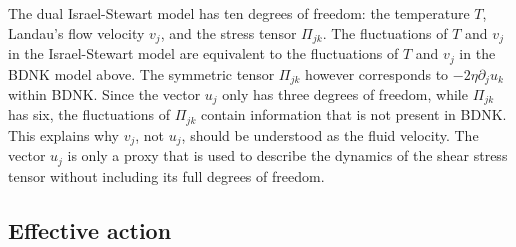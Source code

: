 \documentclass[a4paper, amsfonts, amssymb, amsmath, reprint, showkeys, nofootinbib, twoside,notitlepage,onecolumn]{revtex4-2}
\theoremstyle{definition}
\begin{document}
The dual Israel-Stewart model has ten degrees of freedom: the temperature $T$, Landau's flow velocity $v_j$, and the stress tensor $\Pi_{jk}$. The fluctuations of $T$ and $v_j$ in the Israel-Stewart model are equivalent to the fluctuations of $T$ and $v_j$ in the BDNK model above. The symmetric tensor $\Pi_{jk}$ however corresponds to $-2\eta \partial_j u_k$ within BDNK. Since the vector $u_j$ only has three degrees of freedom, while $\Pi_{jk}$ has six, the fluctuations of $\Pi_{jk}$ contain information that is not present in BDNK. This explains why $v_j$, not $u_j$, should be understood as the fluid velocity. The vector $u_j$ is only a proxy that is used to describe the dynamics of the shear stress tensor without including its full degrees of freedom. 

\subsection{Effective action}
\end{document}
